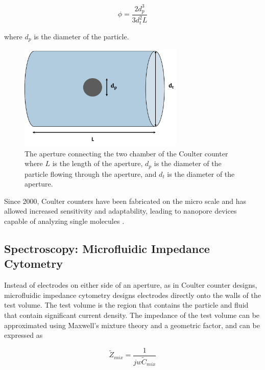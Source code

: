 \begin{equation}
    \phi = \frac{2d_p^3}{3d^2_tL}
\end{equation}

\noindent where $d_p$ is the diameter of the particle.

\begin{figure}[ht]
    \centering
    \includegraphics[width=0.7\textwidth]{images/aperture.png}
    \caption[The aperture connecting the two chamber of the Coulter counter.]{The aperture connecting the two chamber of the Coulter counter where $L$ is the length of the aperture, $d_p$ is the diameter of the particle flowing through the aperture, and $d_{t}$ is the diameter of the aperture.}
    \label{fig:aperture}
\end{figure}
 
\par Since 2000, Coulter counters have been fabricated on the micro scale and has allowed increased sensitivity and adaptability, leading to nanopore devices capable of analyzing single molecules \cite{sun_single-cell_2010}.
 
 \subsection*{Spectroscopy: Microfluidic Impedance Cytometry}
 \par Instead of electrodes on either side of an aperture, as in Coulter counter designs, microfluidic impedance cytometry designs electrodes directly onto the walls of the test volume. The test volume is the region that contains the particle and fluid that contain significant current density. The impedance of the test volume can be approximated using Maxwell's mixture theory and a geometric factor, and can be expressed as 
 
 \begin{equation}
       \tilde{Z}_{mix} = \frac{1}{jw\tilde{C}_{mix}}
    \label{eqn:impedance_with_cap}
 \end{equation}
 
